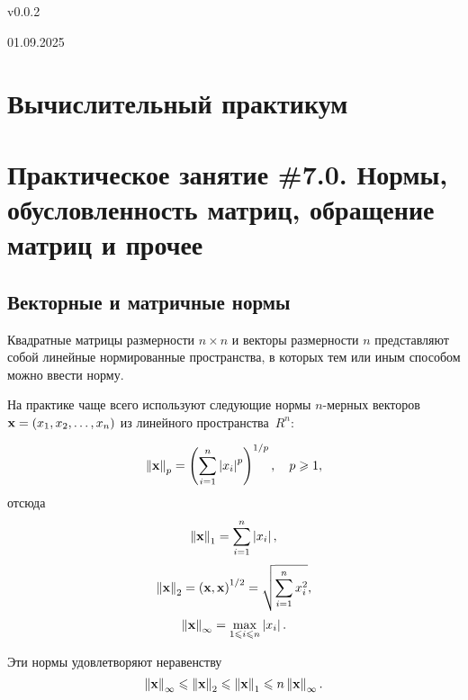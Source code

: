 \documentclass[12pt]{article}
\newcommand{\norm}[1]{\left\| #1 \right\|}
\begin{document}
	\begin{flushright}
		{v0.0.2}
	\end{flushright}
	\begin{flushright}
		{01.09.2025}
	\end{flushright}
	\section*{Вычислительный практикум}
	\section*{Практическое занятие \#7.0. Нормы, обусловленность матриц, обращение матриц и прочее}
	
	\subsection*{Векторные и матричные нормы}
	Квадратные матрицы размерности $n\times n$ и векторы размерности $n$ представляют собой линейные нормированные пространства, в которых тем или иным способом можно ввести норму.
	
	На практике чаще всего используют следующие нормы $n$-мерных векторов $\bold{x}=\left(x_1,x_2,\ldots,x_n\right)$ из линейного пространства~$R^n$:
	
	\begin{equation}
		\norm{\bold{x}}_p=\left(\sum_{i=1}^{n}\left|x_i\right|^p\right)^{1/p},\quad p\geqslant 1,
	\end{equation}
	отсюда
	\begin{equation}
		\norm{\bold{x}}_1=\sum_{i=1}^{n}\left|x_i\right|,
	\end{equation}
	\begin{equation}
		\norm{\bold{x}}_2=\left(\bold{x},\bold{x}\right)^{1/2}=\sqrt{\sum_{i=1}^n x^2_i},
	\end{equation}
	\begin{equation}
		\norm{\bold{x}}_{\infty}=\max_{1\leqslant i \leqslant n}\left|x_i\right|.
	\end{equation}
	
	Эти нормы удовлетворяют неравенству
	\begin{equation}
		\norm{\bold{x}}_{\infty}\leqslant\norm{\bold{x}}_2\leqslant\norm{\bold{x}}_1\leqslant n\norm{\bold{x}}_{\infty}.
	\end{equation}
	
\end{document}

